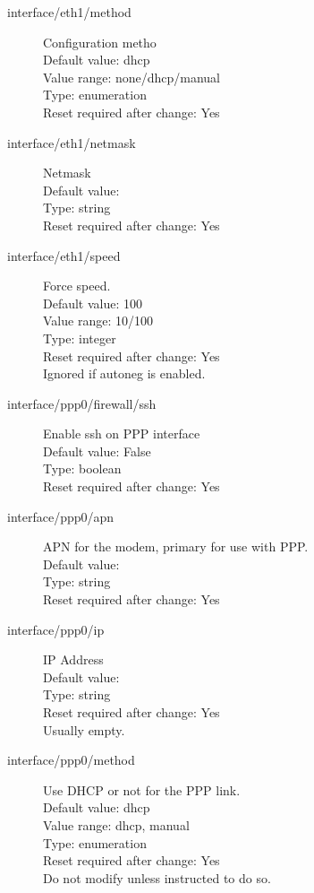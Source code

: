 \begin{description}
\item[interface/eth1/method] Configuration metho\\
  Default value: dhcp\\
  Value range: none/dhcp/manual\\
  Type: enumeration\\
  Reset required after change: Yes\\

\item[interface/eth1/netmask] Netmask\\
  Default value: \\
  Type: string\\
  Reset required after change: Yes\\

\item[interface/eth1/speed] Force speed.\\
  Default value: 100\\
  Value range: 10/100\\
  Type: integer\\
  Reset required after change: Yes\\
  Ignored if autoneg is enabled.\\

\item[interface/ppp0/firewall/ssh] Enable ssh on PPP interface\\
  Default value: False\\
  Type: boolean\\
  Reset required after change: Yes\\

\item[interface/ppp0/apn] APN for the modem, primary for use with PPP.\\
  Default value: \\
  Type: string\\
  Reset required after change: Yes\\

\item[interface/ppp0/ip] IP Address\\
  Default value: \\
  Type: string\\
  Reset required after change: Yes\\
   Usually empty.\\

\item[interface/ppp0/method] Use DHCP or not for the PPP link.\\
  Default value: dhcp\\
  Value range: dhcp, manual\\
  Type: enumeration\\
  Reset required after change: Yes\\
  Do not modify unless instructed to do so.\\


\end{description}
